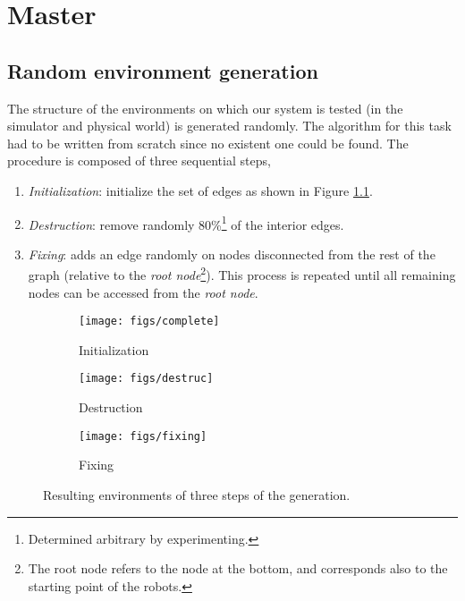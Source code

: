 \documentclass[12pt]{report}
\begin{document}
\chapter{Master}\label{chapter-master}

\section{Random environment generation}
The structure of the environments on which our system is tested (in the simulator and physical world) is generated randomly. The algorithm for this task had to be written from scratch since no existent one could be found. The procedure is composed of three sequential steps,
\begin{enumerate}
\item \textit{Initialization}: initialize the set of edges as shown in Figure \ref{fig:gener-a}.
\item \textit{Destruction}: remove randomly 80\%\footnote{Determined arbitrary by experimenting.} of the interior edges.
\item \textit{Fixing}: adds an edge randomly on nodes disconnected from the rest of the graph (relative to the \textit{root node}\footnote{The root node refers to the node at the bottom, and corresponds also to the starting point of the robots.}). This process is repeated until all remaining nodes can be accessed from the \textit{root node}.
\end{enumerate}

\begin{figure}[!h]
\centering
\begin{subfigure}{.3\textwidth}
  \centering
  \texttt{[image: figs/complete]}
  \caption{Initialization}
  \label{fig:gener-a}
\end{subfigure}%
\begin{subfigure}{.3\textwidth}
  \centering
  \texttt{[image: figs/destruc]}
  \caption{Destruction}
\end{subfigure}
\begin{subfigure}{.3\textwidth}
  \centering
  \texttt{[image: figs/fixing]}
  \caption{Fixing}
\end{subfigure}
\caption{Resulting environments of three steps of the generation.}
\label{fig:gener}
\end{figure}


\end{document}
